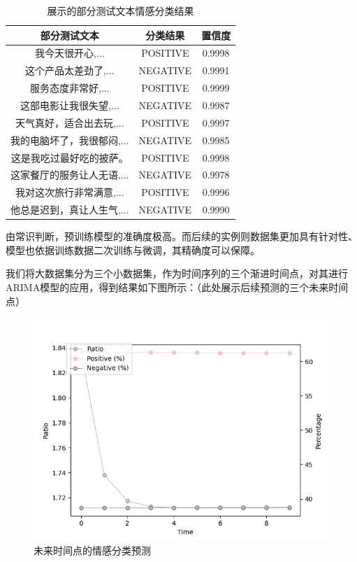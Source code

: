 \documentclass[UTF8,a4paper,15pt,titlepage,oneside]{ctexbook}
\begin{document}
\begin{table}[H]
  \centering
  \begin{tabular}{ccc}
  \toprule
  部分测试文本&分类结果&置信度\\
  \midrule
  我今天很开心,...& \cellcolor{green!20}POSITIVE & 0.9998\\
  这个产品太差劲了,...& \cellcolor{red!20}NEGATIVE & 0.9991\\
  服务态度非常好,...& \cellcolor{green!20}POSITIVE & 0.9999\\
  这部电影让我很失望,...& \cellcolor{red!20}NEGATIVE & 0.9987\\
  天气真好，适合出去玩,...& \cellcolor{green!20}POSITIVE & 0.9997\\
  我的电脑坏了，我很郁闷,...& \cellcolor{red!20}NEGATIVE & 0.9985\\
  这是我吃过最好吃的披萨。& \cellcolor{green!20}POSITIVE & 0.9998\\
  这家餐厅的服务让人无语,...& \cellcolor{red!20}NEGATIVE & 0.9978\\
  我对这次旅行非常满意,...& \cellcolor{green!20}POSITIVE & 0.9996\\
  他总是迟到，真让人生气,...& \cellcolor{red!20}NEGATIVE & 0.9990\\
  \bottomrule
  \end{tabular}
  \caption{展示的部分测试文本情感分类结果}
\end{table}

由常识判断，预训练模型的准确度极高。而后续的实例则数据集更加具有针对性、模型也依据训练数据二次训练与微调，其精确度可以保障。

我们将大数据集分为三个小数据集，作为时间序列的三个渐进时间点，对其进行ARIMA模型的应用，得到结果如下图所示：（此处展示后续预测的三个未来时间点）

\begin{figure}[H]
  \centering
  \includegraphics[width=0.6\linewidth,keepaspectratio=false]{pictures/41.png} %
  \caption{未来时间点的情感分类预测}
\end{figure}
\end{document}
